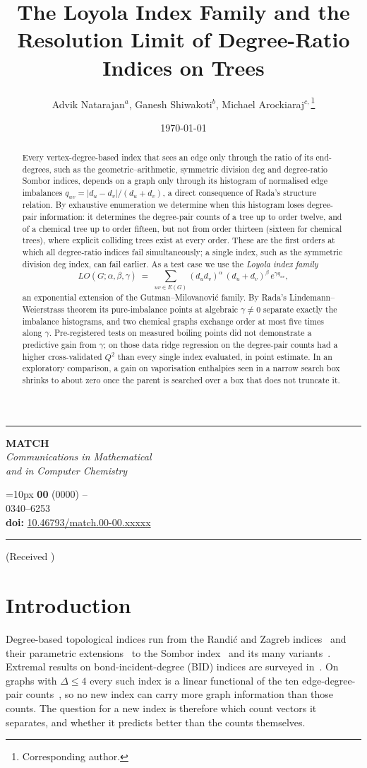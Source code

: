 \documentclass[a5paper, 10pt]{article}
\title{The Loyola Index Family and the Resolution Limit of Degree-Ratio Indices on Trees}
\author{Advik Natarajan$^{a}$, Ganesh Shiwakoti$^{b}$, Michael Arockiaraj$^{c,}$\footnote{Corresponding author.}}
\date{\today}
\makeatletter
\theoremstyle{plain}
\theoremstyle{remark}
\theoremstyle{definition}
\renewcommand{\maketitle}{
	\begin{center}
    \rule[.2em]{\textwidth}{0.353mm}
		\begin{minipage}[m]{0.35\textwidth}
			{\scriptsize
				\begin{center}
					\textsf{\textbf{\huge MATCH}\\
						\textit{Communications in Mathematical\\
							and in Computer Chemistry}
					}
			\end{center}}
		\end{minipage}\hfill
		\begin{minipage}[m]{0.65\textwidth}
			\begin{flushright}
				\baselineskip=10px
				{\scriptsize\sffamily{\itshape  MATCH Commun. Math. Comput. Chem.}
				\textbf{\vol{}}
				(\pubyear)
					\thepage--\pageref{LastPage}}\\
				{\scriptsize\sffamily {\bfseries ISSN:} 0340--6253}\\
				{\scriptsize\sffamily \textbf{doi:} \doi{10.46793/match.\vol-\num.\id}}
			\end{flushright}
		\end{minipage}
		\rule[1em]{\textwidth}{.353mm}
		\baselineskip=0.30in
		{\Large\bfseries \@title} \par
		\vspace{5mm}
		\baselineskip=0.2in
		{\large\bfseries \@author}\par
		\vspace{1mm}
		{\it \@address} \par
		{\small\tt \@email} \par
		\vspace{3mm}
		{\small (Received \@date)} \par
	\end{center}
	\vspace{3mm}
}
\newcommand{\doi}[1]{\href{https://doi.org/#1}{#1}}
\newcommand{\vol}{00}
\newcommand{\num}{00}
\newcommand{\pubyear}{0000}
\newcommand{\id}{xxxxx}
\makeatother
\begin{document}
\maketitle

\begin{abstract}
  Every vertex-degree-based index that sees an edge only through the
  ratio of its end-degrees, such as the geometric--arithmetic,
  symmetric division deg and degree-ratio Sombor indices, depends on a
  graph only through its histogram of normalised edge imbalances
  $q_{uv} = |d_u - d_v|/(d_u + d_v)$, a direct consequence of Rada's
  structure relation. By exhaustive enumeration we determine when this
  histogram loses degree-pair information: it determines the degree-pair
  counts of a tree up to order twelve, and of a chemical tree up to order
  fifteen, but not from order thirteen (sixteen for chemical trees), where
  explicit colliding trees exist at every order. These are the first
  orders at which all degree-ratio indices fail simultaneously; a single
  index, such as the symmetric division deg index, can fail earlier. As a
  test case we use the \emph{Loyola index family}
  \begin{equation*}
  LO(G;\alpha,\beta,\gamma)
  \;=\; \sum_{uv \in E(G)}
  (d_u d_v)^{\alpha}\,(d_u + d_v)^{\beta}\,
  e^{\gamma q_{uv}},
  \end{equation*}
  an exponential extension of the Gutman--Milovanovi\'c family. By Rada's
  Lindemann--Weierstrass theorem its pure-imbalance points at algebraic
  $\gamma \neq 0$ separate exactly the imbalance histograms, and two
  chemical graphs exchange order at most five times along $\gamma$.
  Pre-registered tests on measured boiling points did not demonstrate a
  predictive gain from $\gamma$; on those data ridge regression on the
  degree-pair counts had a higher cross-validated $Q^2$ than every single
  index evaluated, in point estimate. In an exploratory comparison, a gain
  on vaporisation enthalpies seen in a narrow search box shrinks to about
  zero once the parent is searched over a box that does not truncate it.
\end{abstract}

\onehalfspacing

\section{Introduction}\label{sec:intro}

  Degree-based topological indices run from the Randi\'c and Zagreb
  indices~\cite{Randic1975, GutmanTrinajstic1972} and their parametric
  extensions~\cite{BollobasErdos1998, ZhouTrinajstic2010} to the Sombor
  index~\cite{Gutman2021Sombor} and its many
  variants~\cite{Gutman2026SomborSurvey}. Extremal results on
  bond-incident-degree (BID) indices are surveyed
  in~\cite{AliGutmanFurtula2026BID}. On graphs with $\Delta \le 4$ every
  such index is a linear functional of the ten edge-degree-pair
  counts~\cite{Rada2026LinearVDB}, so no new index can carry more graph
  information than those counts. The question for a new index is
  therefore which count vectors it separates, and whether it predicts
  better than the counts themselves.
\end{document}
